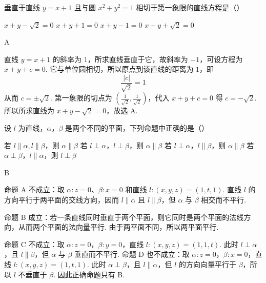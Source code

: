 \begin{problem}
垂直于直线 \( y = x + 1 \) 且与圆 \( x^{2} + y^{2} = 1 \) 相切于第一象限的直线方程是（\quad）

\choices
    {\(x + y - \sqrt{2} = 0\)}
    {\(x + y + 1 = 0\)}
    {\(x + y - 1 = 0\)}
    {\(x + y + \sqrt{2} = 0\)}
\end{problem}

\begin{answer}
A
\end{answer}

\begin{solution}
直线 \(y=x+1\) 的斜率为 \(1\)，所求直线垂直于它，故斜率为 \(-1\)，可设方程为 \(x+y+c=0\). 它与单位圆相切，所以原点到该直线的距离为 \(1\)，即
\[
\frac{|c|}{\sqrt2}=1
\]
从而 \(c=\pm\sqrt2\). 第一象限的切点为 \(\left(\frac1{\sqrt2},\frac1{\sqrt2}\right)\)，代入 \(x+y+c=0\) 得 \(c=-\sqrt2\). 所以所求直线为 \(x+y-\sqrt2=0\)，故选 A.
\end{solution}

\begin{problem}
设 \(l\) 为直线，\(\alpha\)，\(\beta\) 是两个不同的平面，下列命题中正确的是（\quad）

\choices
    {若 \(l \parallel \alpha, l \parallel \beta\)，则 \(\alpha \parallel \beta\)}
    {若 \(l \perp \alpha\)，\(l \perp \beta\)，则 \(\alpha \parallel \beta\)}
    {若 \(l \perp \alpha\)，\(l \parallel \beta\)，则 \(\alpha \parallel \beta\)}
    {若 \(\alpha \perp \beta\)，\(l \parallel \alpha\)，则 \(l \perp \beta\)}
\end{problem}

\begin{answer}
B
\end{answer}

\begin{solution}
命题 A 不成立：取 \(\alpha\colon z=0\)、\(\beta\colon x=0\) 和直线 \(l\colon (x,y,z)=(1,t,1)\). 直线 \(l\) 的方向平行于两平面的交线方向，因而 \(l\parallel\alpha\) 且 \(l\parallel\beta\)，但 \(\alpha\) 与 \(\beta\) 相交而不平行.

命题 B 成立：若一条直线同时垂直于两个平面，则它同时是两个平面的法线方向，从而两个平面的法向量平行. 由于两平面不同，所以两平面平行.

命题 C 不成立：取 \(\alpha\colon z=0\)，\(\beta\colon y=0\)，直线 \(l\colon (x,y,z)=(1,1,t)\). 此时 \(l\perp\alpha\)，且 \(l\parallel\beta\)，但 \(\alpha\) 与 \(\beta\) 垂直而不平行. 命题 D 也不成立：取 \(\alpha\colon z=0\)，\(\beta\colon x=0\)，直线 \(l\colon (x,y,z)=(1,t,1)\). 此时 \(\alpha\perp\beta\)，且 \(l\parallel\alpha\)，但 \(l\) 的方向向量平行于 \(\beta\)，所以 \(l\) 不垂直于 \(\beta\). 因此正确命题只有 B.
\end{solution}

